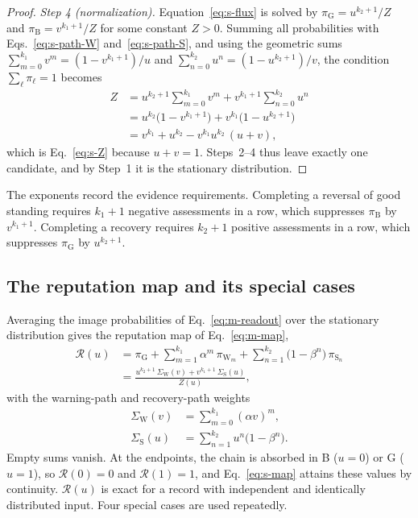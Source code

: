 \documentclass[10pt]{wlscirep}
\newcommand{\Rmap}{\mathscr{R}}            %
\newcommand{\st}[1]{\mathrm{#1}}           %
\theoremstyle{plain}
\theoremstyle{remark}
\begin{document}
\begin{proof}
\textit{Step 4 (normalization).} Equation~\eqref{eq:s-flux} is solved by $\pi_{\st G}=u^{k_2+1}/Z$ and $\pi_{\st B}=v^{k_1+1}/Z$ for some constant $Z>0$. Summing all probabilities with Eqs.~\eqref{eq:s-path-W} and~\eqref{eq:s-path-S}, and using the geometric sums $\sum_{m=0}^{k_1}v^m=(1-v^{k_1+1})/u$ and $\sum_{n=0}^{k_2}u^n=(1-u^{k_2+1})/v$, the condition $\sum_\ell\pi_\ell=1$ becomes
\begin{equation}
\begin{aligned}
Z&=u^{k_2+1}\sum_{m=0}^{k_1}v^m+v^{k_1+1}\sum_{n=0}^{k_2}u^n\\
&=u^{k_2}\bigl(1-v^{k_1+1}\bigr)+v^{k_1}\bigl(1-u^{k_2+1}\bigr)\\
&=v^{k_1}+u^{k_2}-v^{k_1}u^{k_2}\,(u+v),
\end{aligned}
\label{eq:s-normalization}
\end{equation}
which is Eq.~\eqref{eq:s-Z} because $u+v=1$. Steps~2--4 thus leave exactly one candidate, and by Step~1 it is the stationary distribution.
\end{proof}

The exponents record the evidence requirements. Completing a reversal of good standing requires $k_1+1$ negative assessments in a row, which suppresses $\pi_{\st B}$ by $v^{k_1+1}$. Completing a recovery requires $k_2+1$ positive assessments in a row, which suppresses $\pi_{\st G}$ by $u^{k_2+1}$.

\subsection{The reputation map and its special cases}

Averaging the image probabilities of Eq.~\eqref{eq:m-readout} over the stationary distribution gives the reputation map of Eq.~\eqref{eq:m-map},
\begin{equation}
\begin{aligned}
\Rmap(u)&=\pi_{\st G}+\sum_{m=1}^{k_1}\alpha^m\,\pi_{\st W_m}+\sum_{n=1}^{k_2}\bigl(1-\beta^n\bigr)\,\pi_{\st S_n}\\
&=\frac{u^{k_2+1}\,\Sigma_{\mathrm W}(v)+v^{k_1+1}\,\Sigma_{\mathrm S}(u)}{Z(u)},
\end{aligned}
\label{eq:s-map}
\end{equation}
with the warning-path and recovery-path weights
\begin{equation}
\begin{aligned}
\Sigma_{\mathrm W}(v)&=\sum_{m=0}^{k_1}(\alpha v)^m,\\
\Sigma_{\mathrm S}(u)&=\sum_{n=1}^{k_2}u^n\bigl(1-\beta^n\bigr).
\end{aligned}
\label{eq:s-weights}
\end{equation}
Empty sums vanish. At the endpoints, the chain is absorbed in B ($u=0$) or G ($u=1$), so $\Rmap(0)=0$ and $\Rmap(1)=1$, and Eq.~\eqref{eq:s-map} attains these values by continuity. $\Rmap(u)$ is exact for a record with independent and identically distributed input. Four special cases are used repeatedly.
\end{document}
